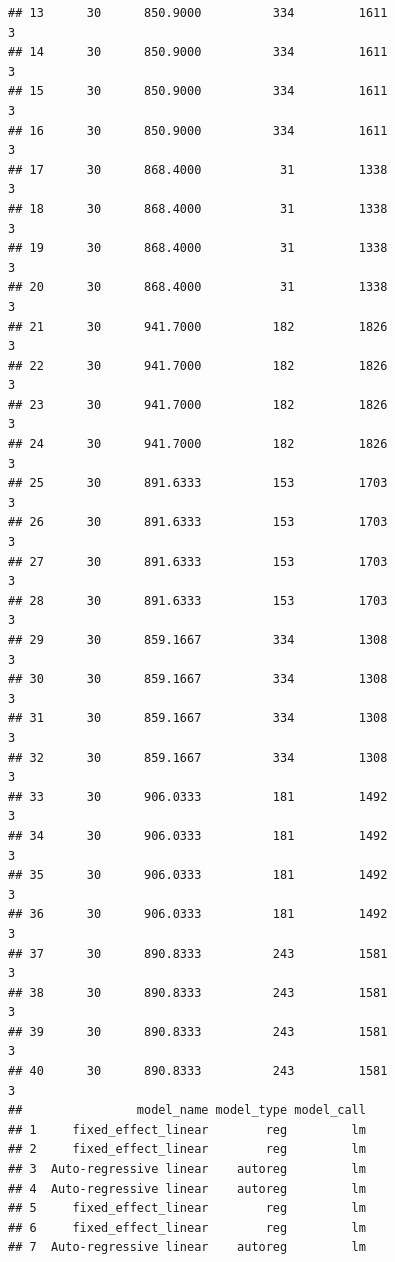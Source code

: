 \documentclass[
]{article}
\begin{document}
\begin{verbatim}
## 13      30      850.9000          334         1611                        3
## 14      30      850.9000          334         1611                        3
## 15      30      850.9000          334         1611                        3
## 16      30      850.9000          334         1611                        3
## 17      30      868.4000           31         1338                        3
## 18      30      868.4000           31         1338                        3
## 19      30      868.4000           31         1338                        3
## 20      30      868.4000           31         1338                        3
## 21      30      941.7000          182         1826                        3
## 22      30      941.7000          182         1826                        3
## 23      30      941.7000          182         1826                        3
## 24      30      941.7000          182         1826                        3
## 25      30      891.6333          153         1703                        3
## 26      30      891.6333          153         1703                        3
## 27      30      891.6333          153         1703                        3
## 28      30      891.6333          153         1703                        3
## 29      30      859.1667          334         1308                        3
## 30      30      859.1667          334         1308                        3
## 31      30      859.1667          334         1308                        3
## 32      30      859.1667          334         1308                        3
## 33      30      906.0333          181         1492                        3
## 34      30      906.0333          181         1492                        3
## 35      30      906.0333          181         1492                        3
## 36      30      906.0333          181         1492                        3
## 37      30      890.8333          243         1581                        3
## 38      30      890.8333          243         1581                        3
## 39      30      890.8333          243         1581                        3
## 40      30      890.8333          243         1581                        3
##                model_name model_type model_call
## 1     fixed_effect_linear        reg         lm
## 2     fixed_effect_linear        reg         lm
## 3  Auto-regressive linear    autoreg         lm
## 4  Auto-regressive linear    autoreg         lm
## 5     fixed_effect_linear        reg         lm
## 6     fixed_effect_linear        reg         lm
## 7  Auto-regressive linear    autoreg         lm

\end{verbatim}
\end{document}
